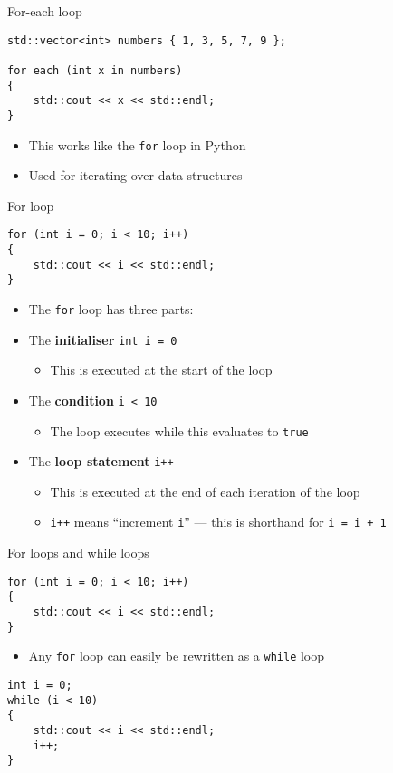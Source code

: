 \begin{frame}[fragile]{For-each loop}
	\begin{lstlisting}
std::vector<int> numbers { 1, 3, 5, 7, 9 };

for each (int x in numbers)
{
    std::cout << x << std::endl;
}
	\end{lstlisting}
    \pause
	\begin{itemize}
		\item This works like the \lstinline{for} loop in Python
		\item Used for iterating over data structures
	\end{itemize}
\end{frame}

\begin{frame}[fragile]{For loop}
	\begin{lstlisting}
for (int i = 0; i < 10; i++)
{
    std::cout << i << std::endl;
}
	\end{lstlisting}
	\pause
    \begin{itemize}
        \item The \lstinline{for} loop has three parts: \pause
        \item The \textbf{initialiser} \lstinline{int i = 0}
        \begin{itemize}
            \item This is executed at the start of the loop
        \end{itemize} \pause
        \item The \textbf{condition} \lstinline{i < 10}
        \begin{itemize}
            \item The loop executes while this evaluates to \lstinline{true}
        \end{itemize} \pause
        \item The \textbf{loop statement} \lstinline{i++}
        \begin{itemize}
            \item This is executed at the end of each iteration of the loop
            \item \lstinline{i++} means ``increment \lstinline{i}'' --- this is shorthand for \lstinline{i = i + 1}
        \end{itemize}
    \end{itemize}
\end{frame}

\begin{frame}[fragile]{For loops and while loops}
	\begin{lstlisting}
for (int i = 0; i < 10; i++)
{
    std::cout << i << std::endl;
}
	\end{lstlisting}
    \begin{itemize}
        \item Any \lstinline{for} loop can easily be rewritten as a \lstinline{while} loop
    \end{itemize}
    \pause
	\begin{lstlisting}
int i = 0;
while (i < 10)
{
    std::cout << i << std::endl;
    i++;
}
	\end{lstlisting}
\end{frame}

